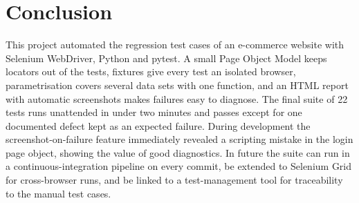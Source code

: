 \documentclass[12pt,a4paper]{article}
\begin{document}
\section{Conclusion}\label{sec:concl}
This project automated the regression test cases of an e-commerce website with Selenium WebDriver, Python and pytest. A small Page Object Model keeps locators out of the tests, fixtures give every test an isolated browser, parametrisation covers several data sets with one function, and an HTML report with automatic screenshots makes failures easy to diagnose. The final suite of 22 tests runs unattended in under two minutes and passes except for one documented defect kept as an expected failure. During development the screenshot-on-failure feature immediately revealed a scripting mistake in the login page object, showing the value of good diagnostics. In future the suite can run in a continuous-integration pipeline on every commit, be extended to Selenium Grid for cross-browser runs, and be linked to a test-management tool for traceability to the manual test cases.
\end{document}
